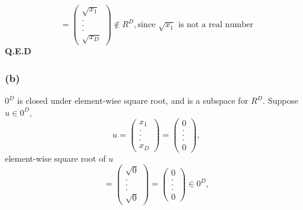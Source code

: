 \documentclass{article}
\begin{document}
    	 \begin{equation*}
    		= \begin{pmatrix} \sqrt{x_1} \\ . \\ . \\ . \\ \sqrt{x_D} \end{pmatrix} \notin R^D, \text{since  $\sqrt{x_1}$ is not a real number} 
    	\end{equation*}
    	\textbf{Q.E.D}
    \subsubsection*{(b)}
    	$0^D$ is closed under element-wise square root, and is a subspace for $R^D$. Suppose $u \in 0^D$,
    	 \begin{equation*}
    		u= \begin{pmatrix} x_1 \\ . \\ . \\ . \\ x_D \end{pmatrix} = \begin{pmatrix} 0 \\ . \\ . \\ . \\ 0 \end{pmatrix},
    	\end{equation*}
	element-wise square root of $u$
	 \begin{equation*}
    		= \begin{pmatrix} \sqrt{0} \\ . \\ . \\ . \\ \sqrt{0} \end{pmatrix}  = \begin{pmatrix} 0 \\ . \\ . \\ . \\ 0 \end{pmatrix} \in 0^D,
    	\end{equation*}
\end{document}
